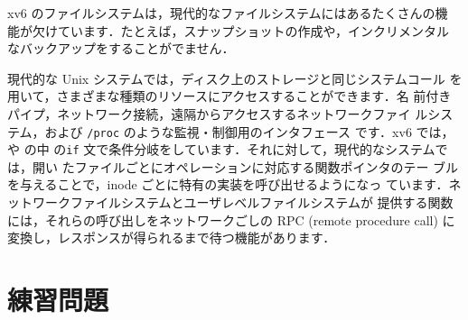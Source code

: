 xv6 のファイルシステムは，現代的なファイルシステムにはあるたくさんの機
能が欠けています．たとえば，スナップショットの作成や，インクリメンタル
なバックアップをすることがでません．

現代的な Unix システムでは，ディスク上のストレージと同じシステムコール
を用いて，さまざまな種類のリソースにアクセスすることができます．名
前付きパイプ，ネットワーク接続，遠隔からアクセスするネットワークファイ
ルシステム，および \texttt{/proc} のような監視・制御用のインタフェース
です．xv6 では，  や  の中
の\texttt{if} 文で条件分岐をしています．それに対して，現代的なシステムでは，開い
たファイルごとにオペレーションに対応する関数ポインタのテー
ブルを与えることで，inode ごとに特有の実装を呼び出せるようになっ
ています．ネットワークファイルシステムとユーザレベルファイルシステムが
提供する関数には，それらの呼び出しをネットワークごしの RPC (remote
procedure call) に変換し，レスポンスが得られるまで待つ機能があります．

\section{練習問題}

